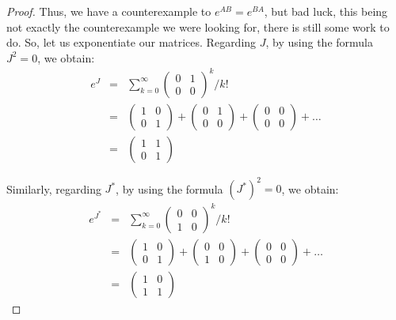 \documentclass[12pt]{amsbook}
\begin{document}
\begin{proof}
Thus, we have a counterexample to $e^{AB}=e^{BA}$, but bad luck, this being not exactly the counterexample we were looking for, there is still some work to do. So, let us exponentiate our matrices. Regarding $J$, by using the formula $J^2=0$, we obtain:
\begin{eqnarray*}
e^J
&=&\sum_{k=0}^\infty\begin{pmatrix}0&1\\0&0\end{pmatrix}^k\Big/k!\\
&=&\begin{pmatrix}1&0\\0&1\end{pmatrix}+\begin{pmatrix}0&1\\0&0\end{pmatrix}+\begin{pmatrix}0&0\\0&0\end{pmatrix}+\ldots\\
&=&\begin{pmatrix}1&1\\0&1\end{pmatrix}
\end{eqnarray*}

Similarly, regarding $J^*$, by using the formula $(J^*)^2=0$, we obtain:
\begin{eqnarray*}
e^{J^*}
&=&\sum_{k=0}^\infty\begin{pmatrix}0&0\\1&0\end{pmatrix}^k\Big/k!\\
&=&\begin{pmatrix}1&0\\0&1\end{pmatrix}+\begin{pmatrix}0&0\\1&0\end{pmatrix}+\begin{pmatrix}0&0\\0&0\end{pmatrix}+\ldots\\
&=&\begin{pmatrix}1&0\\1&1\end{pmatrix}
\end{eqnarray*}


\end{proof}
\end{document}
